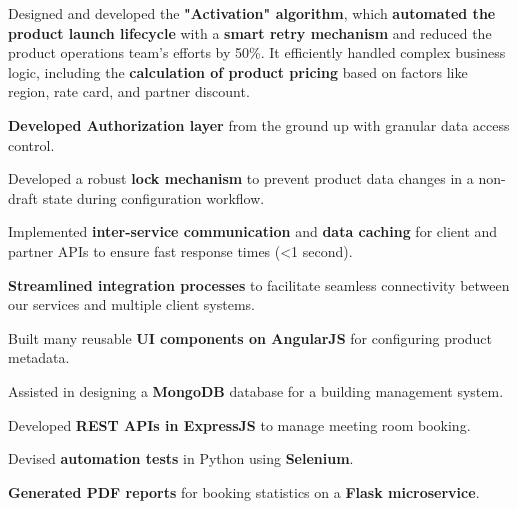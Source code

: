 \documentclass[]{resume-openfont}
\begin{document}
\begin{minipage}[t]{0.66\textwidth}
\begin{tightemize}
\item Designed and developed the \textbf{"Activation" algorithm}, which \textbf{automated the product launch lifecycle} with a \textbf{smart retry mechanism} and reduced the product operations team's efforts by 50\%. It efficiently handled complex business logic, including the \textbf{calculation of product pricing} based on factors like region, rate card, and partner discount.
\item \textbf{Developed Authorization layer} from the ground up with granular data access control.
\item Developed a robust \textbf{lock mechanism} to prevent product data changes in a non-draft state during configuration workflow.
\item Implemented \textbf{inter-service communication} and \textbf{data caching} for client and partner APIs to ensure fast response times (<1 second).
\item \textbf{Streamlined integration processes} to facilitate seamless connectivity between our services and multiple client systems.
\item Built many reusable \textbf{UI components on AngularJS} for configuring product metadata.
\end{tightemize}
\sectionsep

\begin{tightemize}
\item Assisted in designing a \textbf{MongoDB} database  for a building management system.
\item Developed \textbf{REST APIs in ExpressJS} to manage meeting room booking.
\item Devised \textbf{automation tests} in Python using \textbf{Selenium}.
\item  \textbf{Generated PDF reports} for booking statistics on a \textbf{Flask microservice}.
\end{tightemize}
\sectionsep




\end{minipage}
\end{document}
